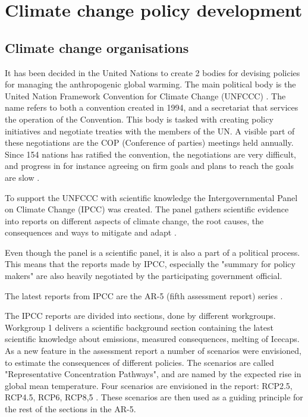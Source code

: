 \section{Climate change policy development}\label{politics}
\subsection{Climate change organisations}
It has been decided in the United Nations to create 2 bodies for devising policies for managing the anthropogenic global warming. The main political body is the United Nation Framework Convention for Climate Change (UNFCCC) \cite{schipper2009}. The name refers to both a convention created in 1994, and a secretariat that services the operation of the Convention. This body is tasked with creating policy initiatives and negotiate treaties with the members of the UN. A visible part of these negotiations are the COP (Conference of parties) meetings held annually. Since 154 nations has ratified the convention, the negotiations are very difficult, and progress in for instance agreeing on firm goals and plans to reach the goals are slow \cite{}.

To support the UNFCCC with scientific knowledge the Intergovernmental Panel on Climate Change (IPCC) was created. The panel gathers scientific evidence into reports on different aspects of climate change, the root causes, the consequences and ways to mitigate and adapt \cite{IPCC2014}.

Even though the panel is a scientific panel, it is also a part of a political process. This means that the reports made by IPCC, especially the "summary for policy makers" are also heavily negotiated by the participating government official.

The latest reports from IPCC are the AR-5 (fifth assessment report) series .

The IPCC reports are divided into sections, done by different workgroups. Workgroup 1 delivers a scientific background section containing the latest scientific knowledge about emissions, measured consequences, melting of Icecaps. As a new feature in the assessment report a number of scenarios were envisioned, to estimate the consequences of different policies. The scenarios are called "Representative Concentration Pathways", and are named by the expected rise in global mean temperature. Four scenarios are envisioned in the report: RCP2.5, RCP4.5, RCP6, RCP8,5 \cite{stocker2013climate}. These scenarios are then used as a guiding principle for the rest of the sections in the AR-5.

